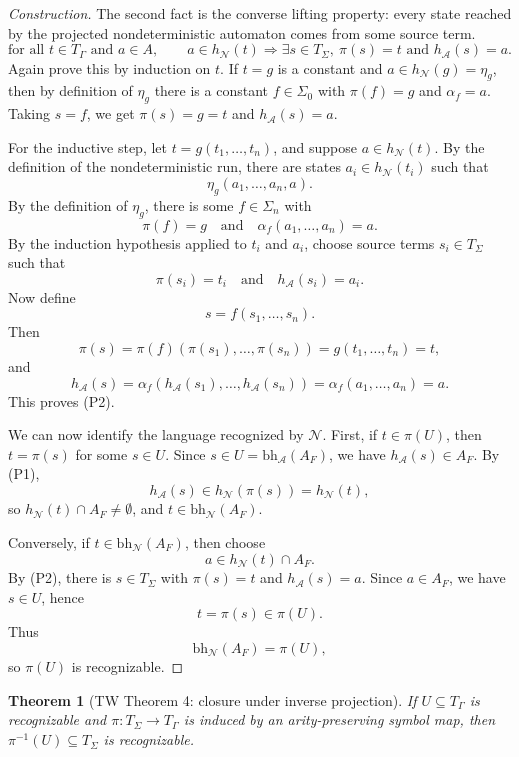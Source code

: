 \documentclass[11pt]{article}
\newtheorem{theorem}{Theorem}
\theoremstyle{definition}
\newcommand{\SigmaSym}{\Sigma}
\newcommand{\Term}[1]{T_{#1}}
\newcommand{\Aut}{\mathcal A}
\newcommand{\bh}{\mathrm{bh}}
\begin{document}
\begin{proof}[Construction]
The second fact is the converse lifting property: every state reached by the
projected nondeterministic automaton comes from some source term.
\[
  \text{for all }t\in\Term{\Gamma}\text{ and }a\in A,\qquad
  a\in h_{\mathcal N}(t)
  \Rightarrow
  \exists s\in\Term{\SigmaSym},\ \pi(s)=t\text{ and }h_\Aut(s)=a.       \tag{P2}
\]
Again prove this by induction on \(t\).  If \(t=g\) is a constant and
\(a\in h_{\mathcal N}(g)=\eta_g\), then by definition of \(\eta_g\) there is a
constant \(f\in\SigmaSym_0\) with \(\pi(f)=g\) and \(\alpha_f=a\).  Taking
\(s=f\), we get \(\pi(s)=g=t\) and \(h_\Aut(s)=a\).

For the inductive step, let \(t=g(t_1,\ldots,t_n)\), and suppose
\(a\in h_{\mathcal N}(t)\).  By the definition of the nondeterministic run,
there are states \(a_i\in h_{\mathcal N}(t_i)\) such that
\[
  \eta_g(a_1,\ldots,a_n,a).
\]
By the definition of \(\eta_g\), there is some \(f\in\SigmaSym_n\) with
\[
  \pi(f)=g
  \quad\text{and}\quad
  \alpha_f(a_1,\ldots,a_n)=a.
\]
By the induction hypothesis applied to \(t_i\) and \(a_i\), choose source terms
\(s_i\in\Term{\SigmaSym}\) such that
\[
  \pi(s_i)=t_i
  \quad\text{and}\quad
  h_\Aut(s_i)=a_i.
\]
Now define
\[
  s=f(s_1,\ldots,s_n).
\]
Then
\[
  \pi(s)
  =
  \pi(f)(\pi(s_1),\ldots,\pi(s_n))
  =
  g(t_1,\ldots,t_n)
  =
  t,
\]
and
\[
  h_\Aut(s)
  =
  \alpha_f(h_\Aut(s_1),\ldots,h_\Aut(s_n))
  =
  \alpha_f(a_1,\ldots,a_n)
  =
  a.
\]
This proves (P2).

We can now identify the language recognized by \(\mathcal N\).  First, if
\(t\in\pi(U)\), then \(t=\pi(s)\) for some \(s\in U\).  Since
\(s\in U=\bh_\Aut(A_F)\), we have \(h_\Aut(s)\in A_F\).  By (P1),
\[
  h_\Aut(s)\in h_{\mathcal N}(\pi(s))=h_{\mathcal N}(t),
\]
so \(h_{\mathcal N}(t)\cap A_F\neq\emptyset\), and \(t\in\bh_{\mathcal N}(A_F)\).

Conversely, if \(t\in\bh_{\mathcal N}(A_F)\), then choose
\[
  a\in h_{\mathcal N}(t)\cap A_F.
\]
By (P2), there is \(s\in\Term{\SigmaSym}\) with \(\pi(s)=t\) and
\(h_\Aut(s)=a\).  Since \(a\in A_F\), we have \(s\in U\), hence
\[
  t=\pi(s)\in\pi(U).
\]
Thus
\[
  \bh_{\mathcal N}(A_F)=\pi(U),
\]
so \(\pi(U)\) is recognizable.
\end{proof}

\begin{theorem}[TW Theorem 4: closure under inverse projection]\label{thm:tw-inverse-projection}
If \(U\subseteq\Term{\Gamma}\) is recognizable and
\(\pi:\Term{\SigmaSym}\to\Term{\Gamma}\) is induced by an arity-preserving symbol
map, then \(\pi^{-1}(U)\subseteq\Term{\SigmaSym}\) is recognizable.
\end{theorem}
\end{document}
